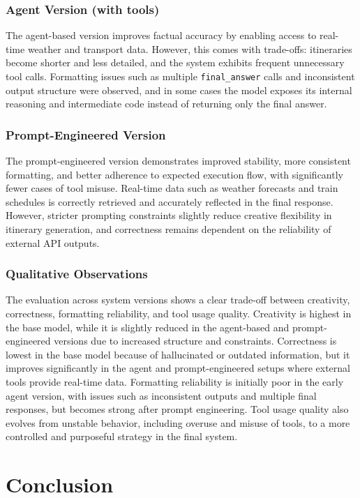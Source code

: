 \documentclass[fleqn,moreauthors,10pt]{ds_report}
\begin{document}
\subsubsection*{Agent Version (with tools)}
The agent-based version improves factual accuracy by enabling access to 
real-time weather and transport data. However, this comes with trade-offs: 
itineraries become shorter and less detailed, and the system exhibits 
frequent unnecessary tool calls. Formatting issues such as multiple 
\texttt{final\_answer} calls and inconsistent output structure were 
observed, and in some cases the model exposes its internal reasoning and 
intermediate code instead of returning only the final answer.

\subsubsection*{Prompt-Engineered Version}
The prompt-engineered version demonstrates improved stability, more 
consistent formatting, and better adherence to expected execution flow, 
with significantly fewer cases of tool misuse. Real-time data such as 
weather forecasts and train schedules is correctly retrieved and 
accurately reflected in the final response. However, stricter prompting 
constraints slightly reduce creative flexibility in itinerary generation, 
and correctness remains dependent on the reliability of external API outputs.

\subsubsection*{Qualitative Observations}
The evaluation across system versions shows a clear trade-off between creativity, correctness, formatting reliability, and tool usage quality. Creativity is highest in the base model, while it is slightly reduced in the agent-based and prompt-engineered versions due to increased structure and constraints. Correctness is lowest in the base model because of hallucinated or outdated information, but it improves significantly in the agent and prompt-engineered setups where external tools provide real-time data. Formatting reliability is initially poor in the early agent version, with issues such as inconsistent outputs and multiple final responses, but becomes strong after prompt engineering. Tool usage quality also evolves from unstable behavior, including overuse and misuse of tools, to a more controlled and purposeful strategy in the final system.


\section*{Conclusion}
\end{document}
